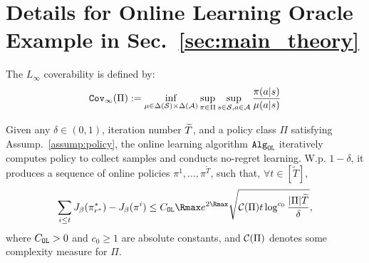 
\section{Details for Online Learning Oracle Example in Sec.~\ref{sec:main_theory}}\label{appx:online_oracle}

\begin{definition}\label{def:l_inf_coverage}
    The $L_\infty$ coverability is defined by:
    \begin{align*}
        {\texttt{Cov}}_\infty(\Pi) := \inf_{\mu\in\Delta(\mathcal{S})\times\Delta(\mathcal{A})} \sup_{\pi\in\Pi} \sup_{s\in\mathcal{S},a\in\mathcal{A}} \frac{\pi(a|s)}{\mu(a|s)}
    \end{align*}
\end{definition}


\begin{definition}\label{def:online_oracle}
    Given any $\delta \in (0,1)$, iteration number ${\widetilde{T}}$, and a policy class $\Pi$ satisfying Assump.~\ref{assump:policy}, the online learning algorithm $\texttt{Alg}_{\texttt{OL}}$ iteratively computes policy to collect samples and conducts no-regret learning. W.p. $1-\delta$, it produces a sequence of online policies $\pi^1,...,\pi^{\tilde T}$, such that, $\forall t\in[\tilde T]$,
    \begin{align*}
        \sum_{i\leq t} J_\beta(\pi^*_{r^*}) - J_\beta(\pi^i)  
        \leq C_\Online {\Rmax} e^{2{\Rmax}}  \sqrt{\Complexity(\Pi) t \log^{c_0}\frac{|\Pi|\tT}{\delta}},
    \end{align*}
    where $C_{\texttt{OL}} > 0$ and $c_0 \geq 1$ are absolute constants, and $\mathcal{C}(\Pi)$ denotes some complexity measure for $\Pi$.
\end{definition}


